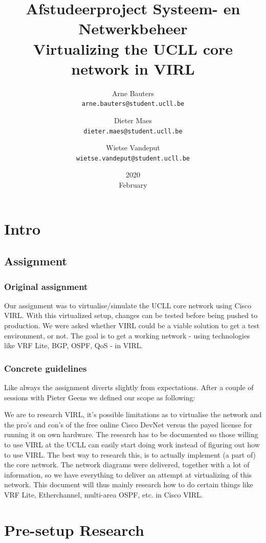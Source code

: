 \documentclass{article}
\title{Afstudeerproject Systeem- en Netwerkbeheer\\
	\large Virtualizing the UCLL core network in VIRL}
\date{2020\\ February}
\author{Arne Bauters\\
	\texttt{arne.bauters@student.ucll.be}
	\and 
	Dieter Maes\\
	\texttt{dieter.maes@student.ucll.be}
	\and
	Wietse Vandeput\\
	\texttt{wietse.vandeput@student.ucll.be}
}
\begin{document}


\tableofcontents

\newpage
\section{Intro}
\subsection{Assignment}

\subsubsection{Original assignment}	
Our assignment was to virtualise/simulate the UCLL core network using Cisco VIRL.
With this virtualized setup, changes can be tested before being pushed to production.
We were asked whether VIRL could be a viable solution to get a test environment, or not.
The goal is to get a working network
- using technologies like VRF Lite, BGP, OSPF, QoS - in VIRL.

\subsubsection{Concrete guidelines}	
Like always the assignment diverts slightly from expectations.
After a couple of sessions with Pieter Geens we defined our scope as following:

We are to research VIRL, it's possible limitations as to virtualise the network and the pro's and con's of the free online Cisco DevNet versus the payed license for running it on own hardware.
The research has to be documented so those willing to use VIRL at the UCLL can easily start doing work instead of figuring out how to use VIRL.
The best way to research this, is to actually implement (a part of) the core network.
The network diagrams were delivered, together with a lot of information,
so we have everything to deliver an attempt at virtualizing of this network.
This document will thus mainly research how to do certain things like VRF Lite, Etherchannel, multi-area OSPF, etc. in Cisco VIRL.

\newpage
\section{Pre-setup Research}
\end{document}
